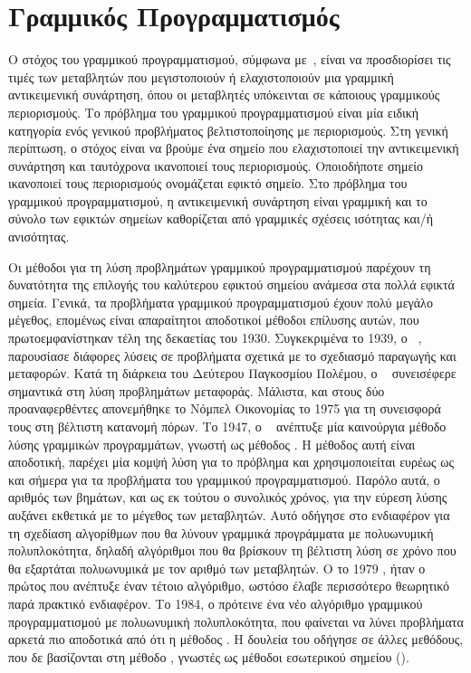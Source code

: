 \chapter{Γραμμικός Προγραμματισμός}\label{ch:lp}
Ο στόχος του γραμμικού προγραμματισμού, σύμφωνα με~\cite{chong2010}, είναι να
προσδιορίσει τις τιμές των μεταβλητών που μεγιστοποιούν ή ελαχιστοποιούν μια γραμμική
αντικειμενική συνάρτηση, όπου οι μεταβλητές υπόκεινται σε κάποιους γραμμικούς περιορισμούς.
Το πρόβλημα του γραμμικού προγραμματισμού είναι μία ειδική κατηγορία ενός γενικού
προβλήματος βελτιστοποίησης με περιορισμούς. Στη γενική περίπτωση, ο στόχος είναι να βρούμε
ένα σημείο που ελαχιστοποιεί την αντικειμενική συνάρτηση και ταυτόχρονα ικανοποιεί τους περιορισμούς.
Οποιοδήποτε σημείο ικανοποιεί τους περιορισμούς ονομάζεται εφικτό σημείο. Στο πρόβλημα του γραμμικού
προγραμματισμού, η αντικειμενική συνάρτηση είναι γραμμική και το σύνολο των εφικτών σημείων καθορίζεται
από γραμμικές σχέσεις ισότητας και/ή ανισότητας.

Οι μέθοδοι για τη λύση προβλημάτων γραμμικού προγραμματισμού παρέχουν τη
δυνατότητα της επιλογής του καλύτερου εφικτού σημείου ανάμεσα στα πολλά εφικτά
σημεία. Γενικά, τα προβλήματα γραμμικού προγραμματισμού έχουν πολύ μεγάλο
μέγεθος, επομένως είναι απαραίτητοι αποδοτικοί μέθοδοι επίλυσης αυτών, που
πρωτοεμφανίστηκαν τέλη της δεκαετίας του 1930. Συγκεκριμένα το 1939, ο
~\cite{kantorovich1939}, παρουσίασε διάφορες λύσεις σε
προβλήματα σχετικά με το σχεδιασμό παραγωγής και μεταφορών. Κατά τη διάρκεια του
Δεύτερου Παγκοσμίου Πολέμου, ο ~\cite{koopmans1949} συνεισέφερε
σημαντικά στη λύση προβλημάτων μεταφοράς. Μάλιστα, και στους δύο προαναφερθέντες
απονεμήθηκε το Νόμπελ Οικονομίας το 1975 για τη συνεισφορά τους στη βέλτιστη κατανομή
πόρων. Το 1947, ο ~\cite{dantzig1963} ανέπτυξε μία καινούργια μέθοδο λύσης
γραμμικών προγραμμάτων, γνωστή ως μέθοδος . Η μέθοδος αυτή είναι αποδοτική, παρέχει
μία κομψή λύση για το πρόβλημα και χρησιμοποιείται ευρέως ως και σήμερα για τα προβλήματα
του γραμμικού προγραμματισμού. Παρόλο αυτά, ο αριθμός των βημάτων, και ως εκ
τούτου ο συνολικός χρόνος, για την εύρεση λύσης αυξάνει εκθετικά με το μέγεθος των μεταβλητών.
Αυτό οδήγησε στο ενδιαφέρον για τη σχεδίαση αλγορίθμων που θα λύνουν γραμμικά προγράμματα με
πολυωνυμική πολυπλοκότητα, δηλαδή αλγόριθμοι που θα βρίσκουν τη βέλτιστη λύση σε χρόνο που θα
εξαρτάται πολυωνυμικά με τον αριθμό των μεταβλητών. Ο  το 1979
\cite{khachiyan1979}, ήταν ο πρώτος που ανέπτυξε έναν τέτοιο αλγόριθμο, ωστόσο έλαβε
περισσότερο θεωρητικό παρά πρακτικό ενδιαφέρον. Το 1984, ο 
\cite{karmarkar1984} πρότεινε ένα νέο αλγόριθμο γραμμικού προγραμματισμού με
πολυωνυμική πολυπλοκότητα, που φαίνεται να λύνει προβλήματα αρκετά πιο αποδοτικά
από ότι η μέθοδος . Η δουλεία του  οδήγησε σε άλλες μεθόδους,
που δε βασίζονται στη μέθοδο , γνωστές ως μέθοδοι εσωτερικού σημείου
().

